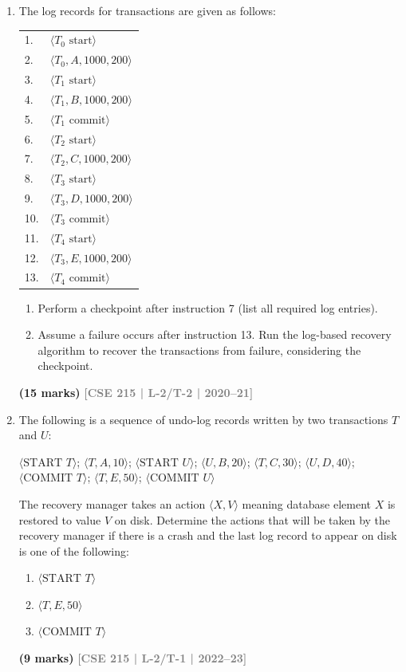 \documentclass[12pt,a3paper]{article}
\newcommand{\yr}[1]{\hfill\textcolor{gray}{\small\textbf{[#1]}}}
\newcommand{\mk}[1]{\textcolor{orange!70!black}{\small\textbf{(#1 marks)}}}
\begin{document}
\begin{enumerate}
\item The log records for transactions are given as follows:
\begin{center}
\small\ttfamily
\begin{tabular}{ll}
1. & $\langle T_0 \text{ start} \rangle$\\
2. & $\langle T_0, A, 1000, 200 \rangle$\\
3. & $\langle T_1 \text{ start} \rangle$\\
4. & $\langle T_1, B, 1000, 200 \rangle$\\
5. & $\langle T_1 \text{ commit} \rangle$\\
6. & $\langle T_2 \text{ start} \rangle$\\
7. & $\langle T_2, C, 1000, 200 \rangle$\\
8. & $\langle T_3 \text{ start} \rangle$\\
9. & $\langle T_3, D, 1000, 200 \rangle$\\
10. & $\langle T_3 \text{ commit} \rangle$\\
11. & $\langle T_4 \text{ start} \rangle$\\
12. & $\langle T_3, E, 1000, 200 \rangle$\\
13. & $\langle T_4 \text{ commit} \rangle$\\
\end{tabular}
\end{center}
\begin{enumerate}
  \item Perform a checkpoint after instruction 7 (list all required log entries).
  \item Assume a failure occurs after instruction 13. Run the log-based recovery algorithm to recover the transactions from failure, considering the checkpoint.
\end{enumerate}
  \mk{15} \yr{CSE 215 | L-2/T-2 | 2020--21}

\item The following is a sequence of undo-log records written by two transactions $T$ and $U$:
\begin{center}
\small\ttfamily
$\langle\text{START } T\rangle$; $\langle T, A, 10\rangle$; $\langle\text{START } U\rangle$; $\langle U, B, 20\rangle$; $\langle T, C, 30\rangle$; $\langle U, D, 40\rangle$; $\langle\text{COMMIT } T\rangle$; $\langle T, E, 50\rangle$; $\langle\text{COMMIT } U\rangle$
\end{center}
The recovery manager takes an action $\langle X, V\rangle$ meaning database element $X$ is restored to value $V$ on disk. Determine the actions that will be taken by the recovery manager if there is a crash and the last log record to appear on disk is one of the following:
\begin{enumerate}
  \item $\langle\text{START } T\rangle$
  \item $\langle T, E, 50\rangle$
  \item $\langle\text{COMMIT } T\rangle$
\end{enumerate}
  \mk{9} \yr{CSE 215 | L-2/T-1 | 2022--23}


\end{enumerate}
\end{document}
